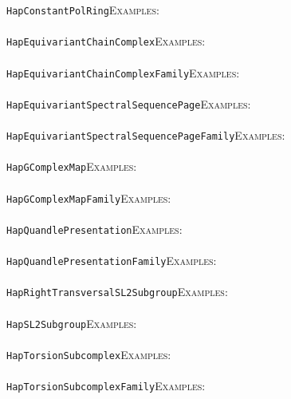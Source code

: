 \documentclass[a4paper,11pt]{report}
\begin{document}
{{ \texttt{HapConstantPolRing}{\nobreakspace}{\nobreakspace}{\nobreakspace}{\nobreakspace}\textsc{Examples:} \\
 \\
 \texttt{HapEquivariantChainComplex}{\nobreakspace}{\nobreakspace}{\nobreakspace}{\nobreakspace}\textsc{Examples:} \\
 \\
 \texttt{HapEquivariantChainComplexFamily}{\nobreakspace}{\nobreakspace}{\nobreakspace}{\nobreakspace}\textsc{Examples:} \\
 \\
 \texttt{HapEquivariantSpectralSequencePage}{\nobreakspace}{\nobreakspace}{\nobreakspace}{\nobreakspace}\textsc{Examples:} \\
 \\
 \texttt{HapEquivariantSpectralSequencePageFamily}{\nobreakspace}{\nobreakspace}{\nobreakspace}{\nobreakspace}\textsc{Examples:} \\
 \\
 \texttt{HapGComplexMap}{\nobreakspace}{\nobreakspace}{\nobreakspace}{\nobreakspace}\textsc{Examples:} \\
 \\
 \texttt{HapGComplexMapFamily}{\nobreakspace}{\nobreakspace}{\nobreakspace}{\nobreakspace}\textsc{Examples:} \\
 \\
 \texttt{HapQuandlePresentation}{\nobreakspace}{\nobreakspace}{\nobreakspace}{\nobreakspace}\textsc{Examples:} \\
 \\
 \texttt{HapQuandlePresentationFamily}{\nobreakspace}{\nobreakspace}{\nobreakspace}{\nobreakspace}\textsc{Examples:} \\
 \\
 \texttt{HapRightTransversalSL2Subgroup}{\nobreakspace}{\nobreakspace}{\nobreakspace}{\nobreakspace}\textsc{Examples:} \\
 \\
 \texttt{HapSL2Subgroup}{\nobreakspace}{\nobreakspace}{\nobreakspace}{\nobreakspace}\textsc{Examples:} \\
 \\
 \texttt{HapTorsionSubcomplex}{\nobreakspace}{\nobreakspace}{\nobreakspace}{\nobreakspace}\textsc{Examples:} \\
 \\
 \texttt{HapTorsionSubcomplexFamily}{\nobreakspace}{\nobreakspace}{\nobreakspace}{\nobreakspace}\textsc{Examples:} \\
 \\
}}
\end{document}
